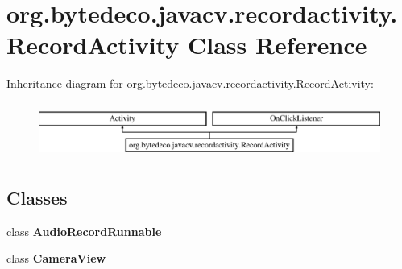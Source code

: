 \hypertarget{classorg_1_1bytedeco_1_1javacv_1_1recordactivity_1_1_record_activity}{}\section{org.\+bytedeco.\+javacv.\+recordactivity.\+Record\+Activity Class Reference}
\label{classorg_1_1bytedeco_1_1javacv_1_1recordactivity_1_1_record_activity}
Inheritance diagram for org.\+bytedeco.\+javacv.\+recordactivity.\+Record\+Activity\+:\begin{figure}[H]
\begin{center}
\leavevmode
\includegraphics[height=1.830065cm]{classorg_1_1bytedeco_1_1javacv_1_1recordactivity_1_1_record_activity}
\end{center}
\end{figure}
\subsection*{Classes}
\begin{DoxyCompactItemize}
\item 
class {\bfseries Audio\+Record\+Runnable}
\item 
class {\bfseries Camera\+View}
\end{DoxyCompactItemize}

